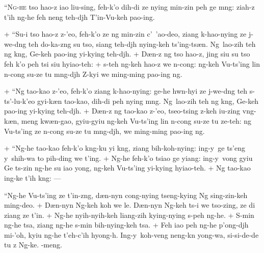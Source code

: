 \header
\lettrine{``N}{g-he} tso hao-z iao liu-sing, feh-k'o dih-di ze nying min-zin peh ge m\oo ng: ziah-z t'ih ng-he feh neng teh-dj\oo h T'in-Vu-keh pao-ing.
\par
+	``Su-i tso hao-z z-'eo, feh-k'o ze ng min-zin c'\y\ 'ao-deo, ziang k\oo-hao-nying ze j\y-we-d\oo ng teh do-ka-z\oo ng su tso, siang teh-dj\oo h nying-keh ts'ing-ts\ae n. Ng\oo\ lao-zih teh ng k\oo ng, Ge-keh pao-ing yi-kying teh-dj\oo h.
+	D\ae n-z ng tso hao-z, jing siu su tso feh k'o peh tsi siu hyiao-teh:
+	s-teh ng-keh hao-z we \e n-cong: ng-keh Vu-ts'ing lin \e n-cong su-ze tu m\oo ng-dj\oo h Z-kyi we ming-ming pao-ing ng.
\par
+	``Ng tao-kao z-'eo, feh-k'o ziang k\oo-hao-nying: ge-he hw\e n-hyi ze j\y-we-d\oo ng teh s-ts'\oo-lu-k'eo gyi-k\ae n tao-kao, dih-di peh nying m\oo ng. Ng\oo\ lao-zih teh ng k\oo ng, Ge-keh pao-ing yi-kying teh-dj\oo h.
+	D\ae n-z ng tao-kao z-'eo, tseo-tsing z-keh iu-zing v\oo ng-k\ae n, meng kw\ae n-gao, gyiu-gyiu ng-keh Vu-ts'ing lin \e n-cong su-ze tu ze-teh: ng Vu-ts'ing ze \e n-cong su-ze tu m\oo ng-dj\oo h, we ming-ming pao-ing ng.
\par
+	``Ng-he tao-kao feh-k'o k\oo ng-ku yi k\oo ng, ziang bih-koh-nying: ing-y\y\ ge ts'eng y\y\ shih-wa to pih-ding we t'ing.
+	Ng-he feh-k'o tsiao ge yiang: ing-y\y\ vong gyiu Ge ts-zin ng-he su iao y\y ong, ng-keh Vu-ts'ing yi-kying hyiao-teh.
+	Ng tao-kao ing-ke t'ih k\oo ng: --- \par ``Ng\oo-he Vu-ts'ing ze t'in-z\oo ng, d\ae n-ny\y n cong-nying tseng-kying Ng sing-zin-keh ming-deo.
+	D\ae n-ny\y n Ng-keh koh we le. D\ae n-ny\y n Ng-keh ts-i we tso-zing, ze di ziang ze t'in.
+	Ng\oo-he nyih-nyih-keh liang-zih kying-nying s-peh ng\oo-he.
+	S\oo-min ng\oo-he tsa, ziang ng\oo-he s\oo-min bih-nying-keh tsa.
+	Feh iao peh ng\oo-he p'ong-dj\oo h mi-'oh, kyiu ng\oo-he t'eh-c'ih hy\y ong-\oo h. Ing-y\y\ koh-veng neng-k\e n y\y ong-wa, si-si-de-de tu z Ng-ke. \OO-meng.